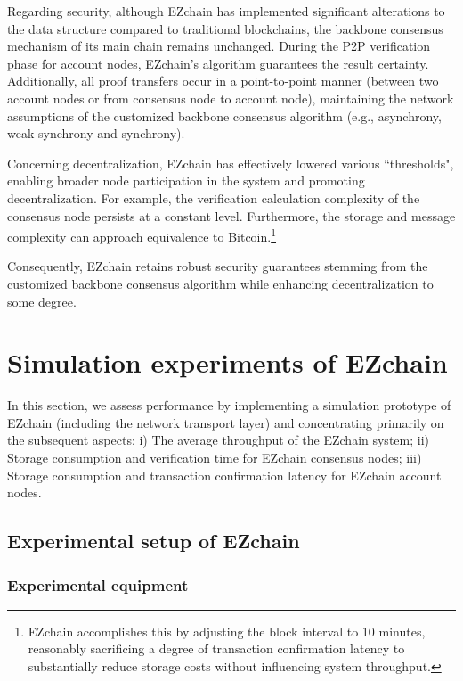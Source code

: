 \documentclass[conference]{IEEEtran}
\begin{document}
Regarding security, although EZchain has implemented significant alterations to the data structure compared to traditional blockchains, the backbone consensus mechanism of its main chain remains unchanged. During the P2P verification phase for account nodes, EZchain's algorithm guarantees the result certainty.  Additionally, all proof transfers occur in a point-to-point manner (between two account nodes or from consensus node to account node), maintaining the network assumptions of the customized backbone consensus algorithm (e.g., asynchrony, weak synchrony and synchrony).

Concerning decentralization, EZchain has effectively lowered various ``thresholds", enabling broader node participation in the system and promoting decentralization. For example, the verification calculation complexity of the consensus node persists at a constant level. Furthermore, the storage and message complexity can approach equivalence to Bitcoin.\footnote{EZchain accomplishes this by adjusting the block interval to 10 minutes, reasonably sacrificing a degree of transaction confirmation latency to substantially reduce storage costs without influencing system throughput.}

Consequently, EZchain retains robust security guarantees stemming from the customized backbone consensus algorithm while enhancing decentralization to some degree.


\section{Simulation experiments of EZchain}
\label{sec: Simulation experiments}

In this section, we assess performance by implementing a simulation prototype of EZchain (including the network transport layer) and concentrating primarily on the subsequent aspects: i) The average throughput of the EZchain system; ii) Storage consumption and verification time for EZchain consensus nodes; iii) Storage consumption and transaction confirmation latency for EZchain account nodes.

\subsection{Experimental setup of EZchain}
\label{subsec: Experimental setup}

\subsubsection{Experimental equipment}
\label{subsubsec: Experimental equipment}
\end{document}
